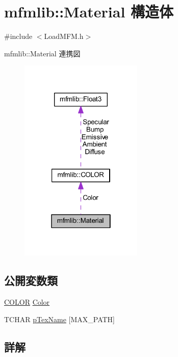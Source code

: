 \hypertarget{structmfmlib_1_1_material}{}\section{mfmlib\+:\+:Material 構造体}
\label{structmfmlib_1_1_material}


{\ttfamily \#include $<$Load\+M\+F\+M.\+h$>$}



mfmlib\+:\+:Material 連携図\nopagebreak
\begin{figure}[H]
\begin{center}
\leavevmode
\includegraphics[width=166pt]{structmfmlib_1_1_material__coll__graph}
\end{center}
\end{figure}
\subsection*{公開変数類}
\begin{DoxyCompactItemize}
\item 
\mbox{\hyperlink{structmfmlib_1_1_c_o_l_o_r}{C\+O\+L\+OR}} \mbox{\hyperlink{structmfmlib_1_1_material_a620cca0ff3e33693e771d703704a6086}{Color}}
\item 
T\+C\+H\+AR \mbox{\hyperlink{structmfmlib_1_1_material_a10b07a0cae5af3ec9f47d5da4a8d35e2}{p\+Tex\+Name}} \mbox{[}M\+A\+X\+\_\+\+P\+A\+TH\mbox{]}
\end{DoxyCompactItemize}


\subsection{詳解}


